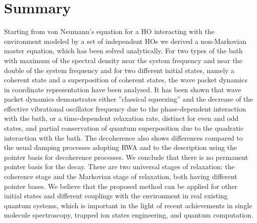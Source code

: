 \documentclass[12pt,twoside,a4paper]{report}
\begin{document}
\section{Summary} \label{quant-conclusions}
Starting from von Neumann's equation for a HO
interacting with the environment modeled by a set of independent
HOs we derived a non-Markovian master equation, which
has been solved analytically. 
For two types of the bath with maximum of the spectral density 
near the system frequency and near the double of the system frequency and
for two different initial states, namely
a coherent state and a superposition of coherent states, the wave
packet dynamics in coordinate representation have been analysed. It has 
been shown that wave packet dynamics demonstrates 
either
''classical squeezing''
and the decrease of the effective vibrational oscillator frequency due
to the phase-dependent interaction with the bath,
or a time-dependent relaxation rate, distinct for even and odd states,
and partial conservation of quantum superposition
due to the quadratic interaction with the bath.  
The decoherence
also shows differences compared to the usual damping processes
adopting RWA and to the description using the pointer basis for
decoherence processes. We conclude that there is no permanent pointer
basis for the decay. There are two universal stages of relaxation: the
coherence stage and the Markovian stage of relaxation, both
having different pointer bases. We believe that the proposed
method can be applied for other initial states and different
couplings with the environment in real existing quantum systems, which is
important in the light of recent achievements in single molecule
spectroscopy, trapped ion states engineering, and quantum computation.


\end{document}
